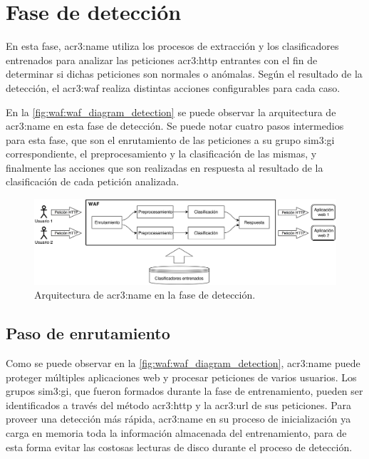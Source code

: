 \section{Fase de detección}

En esta fase, \gls{acr3:name} utiliza los procesos de extracción y
los clasificadores entrenados para analizar las peticiones \gls{acr3:http}
entrantes con el fin de determinar si dichas peticiones son normales o
anómalas. Según el resultado de la detección, el \gls{acr3:waf} realiza
distintas acciones configurables para cada caso.

En la \autoref{fig:waf:waf_diagram_detection} se puede observar la
arquitectura de \gls{acr3:name} en esta fase de detección.
Se puede notar cuatro pasos intermedios para esta fase, que son el
enrutamiento de las peticiones a su grupo \gls{sim3:gi} correspondiente,
el preprocesamiento y la clasificación de las mismas, y finalmente las
acciones que son realizadas en respuesta al resultado de la clasificación
de cada petición analizada.

\begin{figure}[ht]
    \centering
    \includegraphics[width=\linewidth]{images/waf-diagram-detection.png}

    \caption{Arquitectura de \gls{acr3:name} en la fase de
        detección.}
    \label{fig:waf:waf_diagram_detection}
\end{figure}


\subsection{Paso de enrutamiento}

Como se puede observar en la \autoref{fig:waf:waf_diagram_detection},
\gls{acr3:name} puede proteger múltiples aplicaciones web y procesar
peticiones de varios usuarios. Los grupos \gls{sim3:gi}, que fueron
formados durante la fase de entrenamiento, pueden ser identificados a
través del método \gls{acr3:http} y la \gls{acr3:url} de sus peticiones.
Para proveer una detección más rápida, \gls{acr3:name} en su proceso de
inicialización ya carga en memoria toda la información almacenada del
entrenamiento, para de esta forma evitar las costosas lecturas de disco
durante el proceso de detección.

